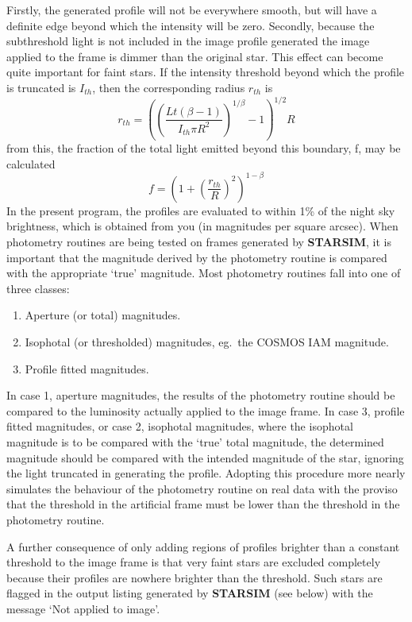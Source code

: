 Firstly, the generated profile will not be everywhere smooth, but will have a
definite edge beyond which the intensity will be zero.
Secondly, because the subthreshold light is not included in the image profile
generated the image applied to the frame is dimmer than the original star.
This effect can become quite important for faint stars.
If the intensity threshold beyond which the profile is truncated is $I_{th}$,
then the corresponding radius $r_{th}$ is
\begin{equation}
r_{th}=((\frac{Lt(\beta -1)}{I_{th}\pi R^{2}})^{1/\beta}-1)^{1/2}R
\end{equation}
from this, the fraction of the total light emitted beyond this boundary, f, may
be calculated
\begin{equation}
f=(1+(\frac{r_{th}}{R})^{2})^{1-\beta}
\end{equation}
In the present program, the profiles are evaluated to within 1\% of the night
sky brightness, which is obtained from you (in magnitudes per square arcsec).
When photometry routines are being tested on frames generated by {\bf STARSIM},
it is important that the magnitude derived by the photometry routine is compared
with the appropriate `true' magnitude.
Most photometry routines fall into one of three classes:
\begin{enumerate}
\item Aperture (or total) magnitudes.
\item Isophotal (or thresholded) magnitudes, eg.\ the COSMOS IAM magnitude.
\item Profile fitted magnitudes.
\end{enumerate}
In case 1, aperture magnitudes, the results of the photometry routine should be
compared to the luminosity actually applied to the image frame.
In case 3, profile fitted magnitudes, or case 2, isophotal magnitudes, where the
isophotal magnitude is to be compared with the `true' total magnitude, the
determined magnitude should be compared with the intended magnitude of the star,
ignoring the light truncated in generating the profile.
Adopting this procedure more nearly simulates the behaviour of the photometry
routine on real data with the proviso that the threshold in the artificial
frame must be lower than the threshold in the photometry routine.

A further consequence of only adding regions of profiles brighter than a
constant threshold to the image frame is that very faint stars are excluded
completely because their profiles are nowhere brighter than the threshold.
Such stars are flagged in the output listing generated by {\bf STARSIM} (see
below) with the message `Not applied to image'.


